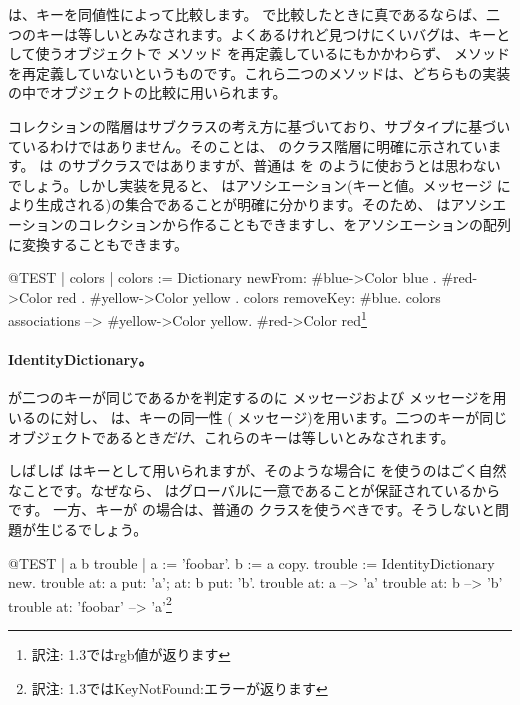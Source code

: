 \documentclass[a4paper,10pt,twoside]{book}
\begin{document}
は、キーを同値性によって比較します。 \ct{=} で比較したときに真であるならば、二つのキーは等しいとみなされます。よくあるけれど見つけにくいバグは、キーとして使うオブジェクトで \ct{=}メソッド を再定義しているにもかかわらず、 メソッドを再定義していないというものです。これら二つのメソッドは、どちらもの実装の中でオブジェクトの比較に用いられます。

コレクションの階層はサブクラスの考え方に基づいており、サブタイプに基づいているわけではありません。そのことは、 のクラス階層に明確に示されています。 は  のサブクラスではありますが、普通は  を  のように使おうとは思わないでしょう。しかし実装を見ると、 はアソシエーション(キーと値。メッセージ  により生成される)の集合であることが明確に分かります。そのため、 はアソシエーションのコレクションから作ることもできますし、をアソシエーションの配列に変換することもできます。

\begin{code}{@TEST | colors |}
colors := Dictionary newFrom: { #blue->Color blue . #red->Color red . #yellow->Color yellow }.
colors removeKey: #blue.
colors associations --> {#yellow->Color yellow. #red->Color red}\footnote{訳注: \pharo 1.3ではrgb値が返ります}
\end{code}

\paragraph{IdentityDictionary。}
 が二つのキーが同じであるかを判定するのに \ct{=} メッセージおよび  メッセージを用いるのに対し、 は、キーの同一性 ( メッセージ)を用います。\ie 二つのキーが同じオブジェクトであるとき\emph{だけ}、これらのキーは等しいとみなされます。

しばしば  はキーとして用いられますが、そのような場合に を使うのはごく自然なことです。なぜなら、 はグローバルに一意であることが保証されているからです。
一方、キーが  の場合は、普通の  クラスを使うべきです。そうしないと問題が生じるでしょう。

\begin{code}{@TEST | a b trouble |}
a := 'foobar'.
b := a copy.
trouble := IdentityDictionary new.
trouble at: a put: 'a'; at: b put: 'b'.
trouble at: a          --> 'a'
trouble at: b          --> 'b'
trouble at: 'foobar' --> 'a'\footnote{訳注: \pharo 1.3ではKeyNotFound:エラーが返ります}
\end{code}
\end{document}
